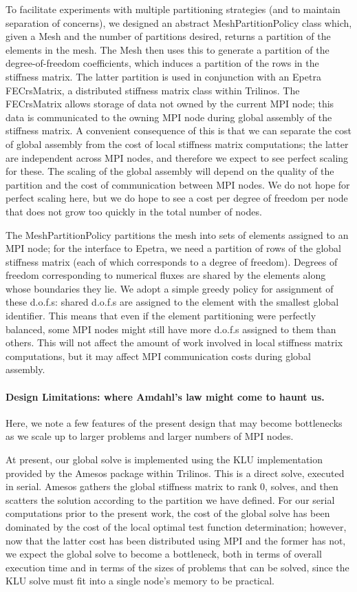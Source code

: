 To facilitate experiments with multiple partitioning strategies (and to maintain separation of concerns), we designed an abstract MeshPartitionPolicy class which, given a Mesh and the number of partitions desired, returns a partition of the elements in the mesh.  The Mesh then uses this to generate a partition of the degree-of-freedom coefficients, which induces a partition of the rows in the stiffness matrix.  The latter partition is used in conjunction with an Epetra FECrsMatrix, a distributed stiffness matrix class within Trilinos.  The FECrsMatrix allows storage of data not owned by the current MPI node; this data is communicated to the owning MPI node during global assembly of the stiffness matrix.  A convenient consequence of this is that we can separate the cost of global assembly from the cost of local stiffness matrix computations; the latter are independent across MPI nodes, and therefore we expect to see perfect scaling for these.  The scaling of the global assembly will depend on the quality of the partition and the cost of communication between MPI nodes.  We do not hope for perfect scaling here, but we do hope to see a cost per degree of freedom per node that does not grow too quickly in the total number of nodes.

The MeshPartitionPolicy partitions the mesh into sets of elements assigned to an MPI node; for the interface to Epetra, we need a partition of rows of the global stiffness matrix (each of which corresponds to a degree of freedom).  Degrees of freedom corresponding to numerical fluxes are shared by the elements along whose boundaries they lie.  We adopt a simple greedy policy for assignment of these d.o.f.s: shared d.o.f.s are assigned to the element with the smallest global identifier.  This means that even if the element partitioning were perfectly balanced, some MPI nodes might still have more d.o.f.s assigned to them than others.  This will not affect the amount of work involved in local stiffness matrix computations, but it may affect MPI communication costs during global assembly.

\paragraph{Design Limitations: where Amdahl's law might come to haunt us.}
Here, we note a few features of the present design that may become bottlenecks as we scale up to larger problems and larger numbers of MPI nodes.

At present, our global solve is implemented using the KLU implementation provided by the Amesos package within Trilinos.  This is a direct solve, executed in serial.  Amesos gathers the global stiffness matrix to rank 0, solves, and then scatters the solution according to the partition we have defined.  For our serial computations prior to the present work, the cost of the global solve has been dominated by the cost of the local optimal test function determination; however, now that the latter cost has been distributed using MPI and the former has not, we expect the global solve to become a bottleneck, both in terms of overall execution time and in terms of the sizes of problems that can be solved, since the KLU solve must fit into a single node's memory to be practical.

